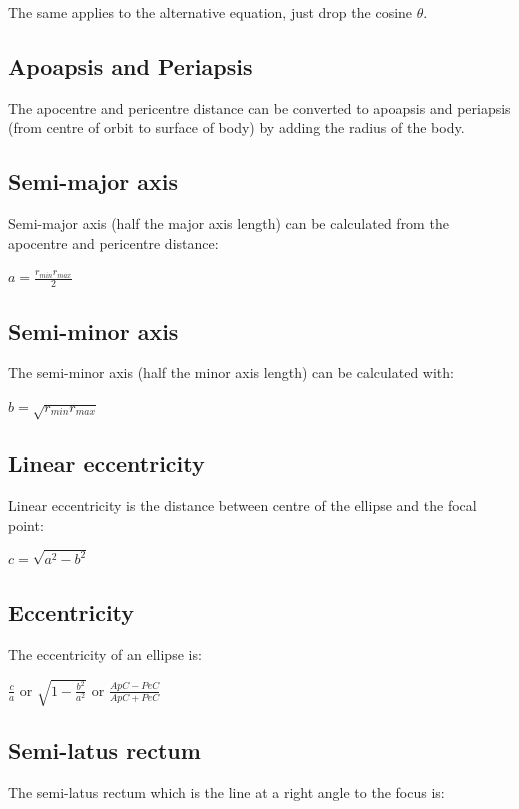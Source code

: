 \documentclass{article}
\begin{document}
The same applies to the alternative equation, just drop the cosine $\theta$.

\subsection{Apoapsis and Periapsis}

The apocentre and pericentre distance can be converted to apoapsis and periapsis (from centre of orbit to surface of body) by adding the radius of the body.

\subsection{Semi-major axis}

Semi-major axis (half the major axis length) can be calculated from the apocentre and pericentre distance:

$ a = \frac{r_{min} r_{max}} {2} $

\subsection{Semi-minor axis}

The semi-minor axis (half the minor axis length) can be calculated with:

$ b = \sqrt{r_{min} r_{max}} $

\subsection{Linear eccentricity}

Linear eccentricity is the distance between centre of the ellipse and the focal point:

$c = \sqrt{a^2 - b^2} $

\subsection{Eccentricity}

The eccentricity of an ellipse is:

$ \frac{c}{a} $ or $ \sqrt{1- \frac{b^2}{a^2}} $ or $ \frac{ApC-PeC}{ApC+PeC} $

\subsection{Semi-latus rectum}

The semi-latus rectum which is the line at a right angle to the focus is:
\end{document}
